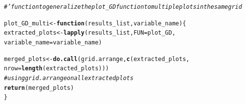 \documentclass[11pt, a4paper, english]{article}\usepackage[]{graphicx}\usepackage[dvipsnames]{xcolor}
\makeatletter
\newcommand{\hlcom}[1]{\textcolor[rgb]{0.678,0.584,0.686}{\textit{#1}}}%
\newcommand{\hlstd}[1]{\textcolor[rgb]{0.345,0.345,0.345}{#1}}%
\newcommand{\hlkwa}[1]{\textcolor[rgb]{0.161,0.373,0.58}{\textbf{#1}}}%
\newcommand{\hlkwb}[1]{\textcolor[rgb]{0.69,0.353,0.396}{#1}}%
\newcommand{\hlkwc}[1]{\textcolor[rgb]{0.333,0.667,0.333}{#1}}%
\newcommand{\hlkwd}[1]{\textcolor[rgb]{0.737,0.353,0.396}{\textbf{#1}}}%
\newenvironment{kframe}{%
 \def\at@end@of@kframe{}%
 \ifinner\ifhmode%
  \def\at@end@of@kframe{\end{minipage}}%
  \begin{minipage}{\columnwidth}%
 \fi\fi%
 \def\FrameCommand##1{\hskip\@totalleftmargin \hskip-\fboxsep
 \colorbox{shadecolor}{##1}\hskip-\fboxsep
     \hskip-\linewidth \hskip-\@totalleftmargin \hskip\columnwidth}%
 \MakeFramed {\advance\hsize-\width
   \@totalleftmargin\z@ \linewidth\hsize
   \@setminipage}}%
 {\par\unskip\endMakeFramed%
 \at@end@of@kframe}
\newenvironment{knitrout}{}{} %
\makeatother
\begin{document}
\begin{knitrout}
\begin{kframe}
\begin{alltt}
\hlcom{#' function to generalize the plot_GD function to multiple plots in the same grid}

\hlstd{plot_GD_multi} \hlkwb{<-}\hlkwa{function}\hlstd{(}\hlkwc{results_list}\hlstd{,} \hlkwc{variable_name}\hlstd{)\{}
  \hlstd{extracted_plots} \hlkwb{<-} \hlkwd{lapply}\hlstd{(results_list,} \hlkwc{FUN}\hlstd{= plot_GD,}
                            \hlkwc{variable_name} \hlstd{= variable_name)}

  \hlstd{merged_plots} \hlkwb{<-} \hlkwd{do.call}\hlstd{(grid.arrange,} \hlkwd{c}\hlstd{(extracted_plots,}
                                          \hlkwc{nrow}\hlstd{=}\hlkwd{length}\hlstd{(extracted_plots)))}
  \hlcom{#using grid.arrange on all extracted plots}
  \hlkwd{return}\hlstd{(merged_plots)}
\hlstd{\}}
\end{alltt}
\end{kframe}
\end{knitrout}
\end{document}
